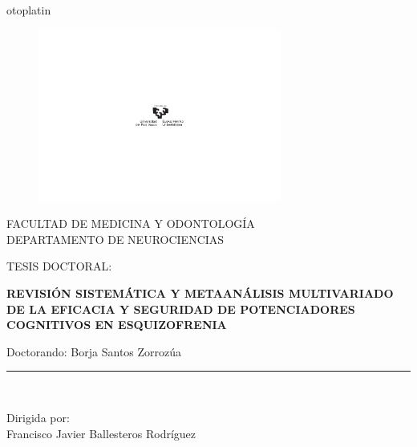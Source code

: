 otoplatin\documentclass[a4paper,openright,12pt]{report}
\begin{document}

\begin{titlepage}

\begin{center}
\vspace*{-1in}
\begin{figure}[htb]
\begin{center}
\includegraphics[width=8cm]{Logotipo_completo}
\end{center}
\end{figure}
\vspace*{0.6in}
FACULTAD DE MEDICINA Y ODONTOLOGÍA\\
\vspace*{0.15in}
DEPARTAMENTO DE NEUROCIENCIAS \\
\vspace*{0.6in}
\begin{large}
TESIS DOCTORAL:\\
\end{large}
\vspace*{0.2in}
\begin{Large}
\textbf{REVISIÓN SISTEMÁTICA Y METAANÁLISIS MULTIVARIADO DE LA EFICACIA Y SEGURIDAD DE POTENCIADORES
COGNITIVOS EN ESQUIZOFRENIA} \\
\end{Large}
\vspace*{0.3in}
\begin{large}
Doctorando: Borja Santos Zorrozúa\\
\end{large}
\vspace*{0.3in}
\rule{80mm}{0.1mm}\\
\vspace*{0.1in}
\begin{large}
Dirigida por: \\
Francisco Javier Ballesteros Rodríguez \\
\end{large}
\end{center}

\end{titlepage}
\end{document}
